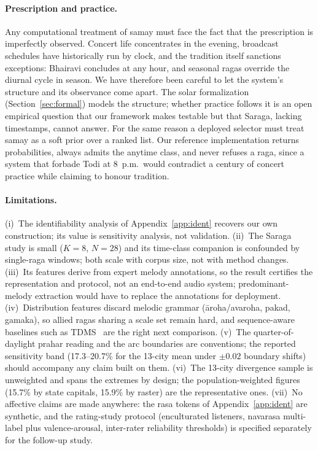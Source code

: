 \documentclass[11pt]{article}
\begin{document}
\paragraph{Prescription and practice.}
Any computational treatment of samay must face the fact that the prescription
is imperfectly observed. Concert life concentrates in the evening, broadcast
schedules have historically run by clock, and the tradition itself sanctions
exceptions: Bhairavi concludes at any hour, and seasonal ragas override the
diurnal cycle in season. We have therefore been careful to let the system's
structure and its observance come apart. The solar formalization
(Section~\ref{sec:formal}) models the structure; whether practice follows it
is an open empirical question that our framework makes testable but that
Saraga, lacking timestamps, cannot answer. For the same reason a deployed
selector must treat samay as a soft prior over a ranked list. Our reference
implementation returns probabilities, always admits the anytime class, and
never refuses a raga, since a system that forbade Todi at 8~p.m.\ would
contradict a century of concert practice while claiming to honour tradition.

\paragraph{Limitations.}
(i)~The identifiability analysis of Appendix~\ref{app:ident} recovers our own
construction; its value is sensitivity analysis, not validation. (ii)~The
Saraga study is small ($K = 8$, $N = 28$) and its time-class companion is
confounded by single-raga windows; both scale with corpus size, not with
method changes. (iii)~Its features derive from expert melody annotations, so
the result certifies the representation and protocol, not an end-to-end audio
system; predominant-melody extraction would have to replace the annotations
for deployment. (iv)~Distribution features discard melodic grammar
(\=aroha/avaroha, pakad, gamaka), so allied ragas sharing a scale set remain
hard, and sequence-aware baselines such as TDMS~\cite{gulati2016} are the
right next comparison. (v)~The quarter-of-daylight prahar reading and the arc
boundaries are conventions; the reported sensitivity band (17.3--20.7\% for
the 13-city mean under $\pm 0.02$ boundary shifts) should accompany any claim
built on them. (vi)~The 13-city divergence sample is unweighted and spans the
extremes by design; the population-weighted figures (15.7\% by state
capitals, 15.9\% by raster) are the representative ones. (vii)~No affective
claims are made anywhere: the rasa tokens of Appendix~\ref{app:ident} are
synthetic, and the rating-study protocol (enculturated listeners, navarasa
multi-label plus valence-arousal, inter-rater reliability thresholds) is
specified separately for the follow-up study.
\end{document}
